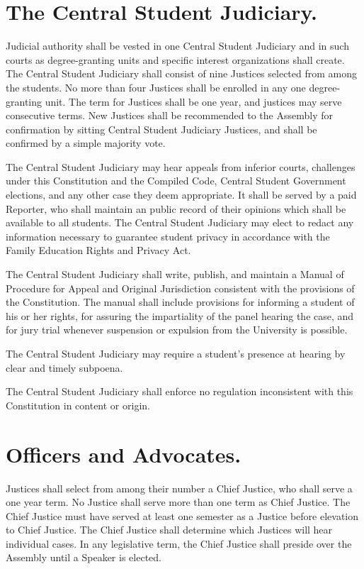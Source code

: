 \section{The Central Student Judiciary.}
    Judicial authority shall be vested in one Central Student Judiciary and in such courts as degree-granting units and specific interest organizations shall create. The Central Student Judiciary shall consist of nine Justices selected from among the students. No more than four Justices shall be enrolled in any one degree-granting unit. The term for Justices shall be one year, and justices may serve consecutive terms. New Justices shall be recommended to the Assembly for confirmation by sitting Central Student Judiciary Justices, and shall be confirmed by a simple majority vote.

    The Central Student Judiciary may hear appeals from inferior courts, challenges under this Constitution and the Compiled Code, Central Student Government elections, and any other case they deem appropriate. It shall be served by a paid Reporter, who shall maintain an public record of their opinions which shall be available to all students. The Central Student Judiciary may elect to redact any information necessary to guarantee student privacy in accordance with the Family Education Rights and Privacy Act.

   The Central Student Judiciary shall write, publish, and maintain a Manual of Procedure for Appeal and Original Jurisdiction consistent with the provisions of the Constitution. The manual shall include provisions for informing a student of his or her rights, for assuring the impartiality of the panel hearing the case, and for jury trial whenever suspension or expulsion from the University is possible.

    The Central Student Judiciary may require a student's presence at hearing by clear and timely subpoena.

    The Central Student Judiciary shall enforce no regulation inconsistent with this Constitution in content or origin.


\section{Officers and Advocates.}
    Justices shall select from among their number a Chief Justice, who shall serve a one year term. No Justice shall serve more than one term as Chief Justice. The Chief Justice must have served at least one semester as a Justice before elevation to Chief Justice. The Chief Justice shall determine which Justices will hear individual cases. In any legislative term, the Chief Justice shall preside over the Assembly until a Speaker is elected.

